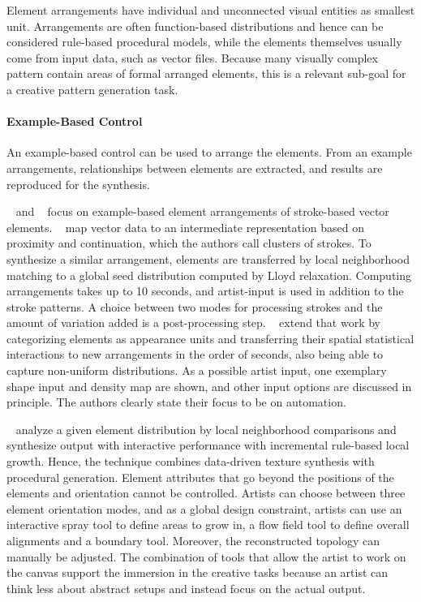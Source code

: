 Element arrangements have individual and unconnected visual entities as smallest unit. Arrangements are often function-based distributions and hence can be considered rule-based procedural models, while the elements themselves usually come from input data, such as vector files. Because many visually complex pattern contain areas of formal arranged elements, this is a relevant sub-goal for a creative pattern generation task.


\paragraph{Example-Based Control}
\label{para:analysis_element_arrangements_example}

An example-based control can be used to arrange the elements. From an example arrangements, relationships between elements are extracted, and results are reproduced for the synthesis. 

\citeauthor*{barla_2006_spa}~\cite{barla_2006_spa} and \citeauthor*{hurtut_2009_ags}~\cite{hurtut_2009_ags} focus on example-based element arrangements of stroke-based vector elements. \citeauthor*{barla_2006_spa}~\cite{barla_2006_spa} map vector data to an intermediate representation based on proximity and continuation, which the authors call clusters of strokes. To synthesize a similar arrangement, elements are transferred by local neighborhood matching to a global seed distribution computed by Lloyd relaxation. Computing arrangements takes up to 10 seconds, and artist-input is used in addition to the stroke patterns. A choice between two modes for processing strokes and the amount of variation added is a post-processing step. \citeauthor*{hurtut_2009_ags}~\cite{hurtut_2009_ags} extend that work by categorizing elements as appearance units and transferring their spatial statistical interactions to new arrangements in the order of seconds, also being able to capture non-uniform distributions. As a possible artist input, one exemplary shape input and density map are shown, and other input options are discussed in principle. The authors clearly state their focus to be on automation.

 \citeauthor*{ijiri_2008_aeb}~\cite{ijiri_2008_aeb} analyze a given element distribution by local neighborhood comparisons and synthesize output with interactive performance with incremental rule-based local growth. Hence, the technique combines data-driven texture synthesis with procedural generation. Element attributes that go beyond the positions of the elements and orientation cannot be controlled. Artists can choose between three element orientation modes, and as a global design constraint, artists can use an interactive spray tool to define areas to grow in, a flow field tool to define overall alignments and a boundary tool. Moreover, the reconstructed topology can manually be adjusted. The combination of tools that allow the artist to work on the canvas support the immersion in the creative tasks because an artist can think less about abstract setups and instead focus on the actual output.

